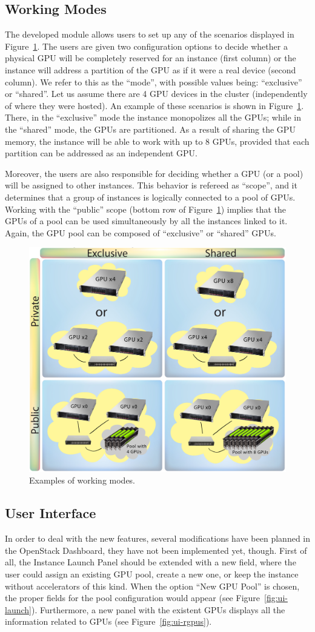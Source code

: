 \documentclass[a4paper,twoside]{article}
\begin{document}
\subsection{Working Modes}
The developed module allows users to set up any of the scenarios displayed in Figure~\ref{fig2}. 
The users are given two configuration options to decide whether a physical GPU will be completely reserved for an instance (first column) or the instance will address a partition of the GPU as if it were a real device (second column).
We refer to this as the ``mode'', with possible values being: ``exclusive'' or ``shared''. 
Let us assume there are 4 GPU devices in the cluster (independently of where they were hosted). 
An example of these scenarios is shown in Figure~\ref{fig2}.
There, in the ``exclusive'' mode the instance monopolizes all the GPUs; while in the ``shared'' mode, the GPUs are partitioned. 
As a result of sharing the GPU memory, the instance will be able to work with up to 8 GPUs, provided that each partition can be addressed as an independent GPU.

Moreover, the users are also responsible for deciding whether a GPU (or a pool) will be assigned to other instances. 
This behavior is refereed as ``scope'', and it determines that a group of instances is logically connected to a pool of GPUs.
Working with the ``public'' scope (bottom row of Figure~\ref{fig2}) implies that the GPUs of a pool can be used simultaneously by all the instances linked to it.
Again, the GPU pool can be composed of ``exclusive'' or ``shared'' GPUs.

\begin{figure}[htb]
  \centering
  \includegraphics[width=.5\textwidth]{images/workingmodes.jpg}
  \caption{Examples of working modes.}
  \label{fig2}
\end{figure}

\subsection{User Interface}
In order to deal with the new features, several modifications have been planned in the OpenStack Dashboard, they have not been implemented yet, though.
First of all, the Instance Launch Panel should be extended with a new field, where the user could assign an existing GPU pool, create a new one, or keep the instance without accelerators of this kind.
When the option ``New GPU Pool'' is chosen, the proper fields for the pool configuration would appear (see Figure~\ref{fig:ui-launch}).
Furthermore, a new panel with the existent GPUs displays all the information related to GPUs (see Figure~\ref{fig:ui-rgpus}).
\end{document}

